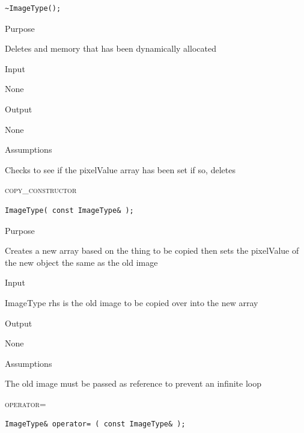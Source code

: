 \documentclass[pdftex, 11pt]{article}
\begin{document}
\begin{description}
\begin{description}
\begin{lstlisting}
~ImageType();
\end{lstlisting}

			\item{Purpose}

				Deletes and memory that has been dynamically allocated

			\item{Input}

				None

			\item{Output}

				None

			\item{Assumptions}

				Checks to see if the pixelValue array has been set
				if so, deletes

		\end{description}


	\item{\textsc{copy\_constructor}}
		\begin{description}

\begin{lstlisting}
ImageType( const ImageType& );
\end{lstlisting}

			\item{Purpose}
		
				Creates a new array based on the thing to be copied
				then sets the pixelValue of the new object the same as
				the old image

			\item{Input}

				ImageType rhs is the old image to be copied over into
				the new array


			\item{Output}

				None

			\item{Assumptions}

				The old image must be passed as reference to prevent
				an infinite loop


		\end{description}


	\item{\textsc{operator=}}
		\begin{description}

\begin{lstlisting}
ImageType& operator= ( const ImageType& );
\end{lstlisting}


\end{description}
\end{description}
\end{document}
